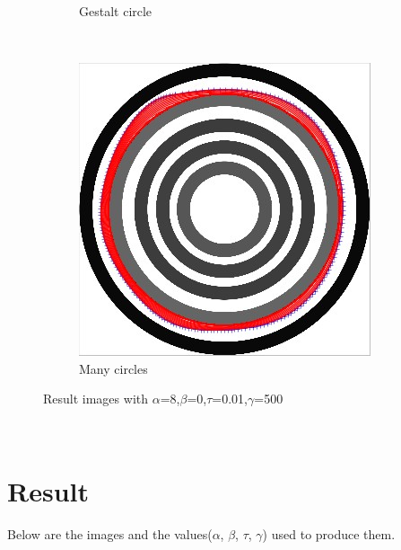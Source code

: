 \documentclass[paper=a4, fontsize=11pt]{scrartcl} %
\numberwithin{equation}{section} %
\numberwithin{figure}{section} %
\numberwithin{table}{section} %
\begin{document}
\begin{figure}[H]
\begin{subfigure}[b]{0.2\textwidth}
                \caption{Gestalt circle}
                \label{fig:Gestaltcircle}
        \end{subfigure}
        ~ %
        \begin{subfigure}[b]{0.2\textwidth}
                \includegraphics[width=\textwidth]{401}
                \caption{Many circles}
                \label{fig:Manycircles}
        \end{subfigure}
        \caption{Result images with $\alpha$=8,$\beta$=0,$\tau$=0.01,$\gamma$=500}\label{fig:resultimages}
\end{figure}
\

\section{Result}
Below are the images and the values($\alpha$, $\beta$, $\tau$, $\gamma$) used to produce them.\\
\end{document}
